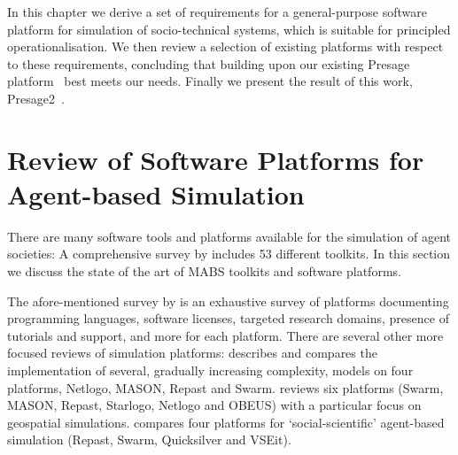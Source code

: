 In this chapter we derive a set of requirements for a general-purpose software platform for simulation of socio-technical systems, which is suitable for principled operationalisation. We then review a selection of existing platforms with respect to these requirements, concluding that building upon our existing Presage platform~\citep{Neville:2009} best meets our needs. Finally we present the result of this work, Presage2~\citep{Macbeth2014}. %

%

\section{Review of Software Platforms for Agent-based Simulation}\label{sec:p2:review}

There are many software tools and platforms available for the simulation of agent societies: A comprehensive survey by \citet{CynthiaNikolaiandGregoryMadey2009} includes 53 different toolkits. In this section we discuss the state of the art of \ac{MABS} toolkits and software platforms.

The afore-mentioned survey by \citet{CynthiaNikolaiandGregoryMadey2009} is an exhaustive survey of platforms documenting programming languages, software licenses, targeted research domains, presence of tutorials and support, and more for each platform. There are several other more focused reviews of simulation platforms: \citet{Railsback2006} describes and compares the implementation of several, gradually increasing complexity, models on four platforms, Netlogo, MASON, Repast and Swarm. \citet{Castle2006} reviews six platforms (Swarm, MASON, Repast, Starlogo, Netlogo and OBEUS) with a particular focus on geospatial simulations. \citet{Tobias2004} compares four platforms for `social-scientific' agent-based simulation (Repast, Swarm, Quicksilver and VSEit).

